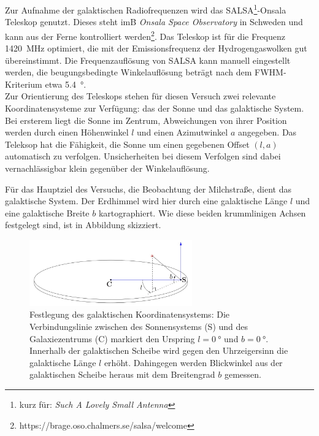 \documentclass[../main.tex]{subfiles}
\begin{document}
Zur Aufnahme der galaktischen Radiofrequenzen wird das SALSA\footnote{kurz für: \textit{Such A Lovely Small Antenna}}-Onsala Teleskop genutzt. Dieses steht imB \textit{Onsala Space Observatory} in Schweden und kann aus der Ferne kontrolliert werden\footnote{https://brage.oso.chalmers.se/salsa/welcome}. Das Teleskop ist für die Frequenz \SI{1420}{\mega\hertz} optimiert, die mit der Emissionsfrequenz der Hydrogengaswolken gut übereinstimmt. Die Frequenzauflösung von SALSA kann manuell eingestellt werden, die beugungsbedingte Winkelauflösung beträgt nach dem FWHM-Kriterium etwa \SI{5.4}{\degree}.\\ 

\noindent Zur Orientierung des Teleskops stehen für diesen Versuch zwei relevante Koordinatensysteme zur Verfügung: das der Sonne und das galaktische System. Bei ersterem liegt die Sonne im Zentrum, Abweichungen von ihrer Position werden durch einen Höhenwinkel $l$ und einen Azimutwinkel $a$ angegeben. Das Teleksop hat die Fähigkeit, die Sonne um einen gegebenen Offset $(l,a)$ automatisch zu verfolgen. Unsicherheiten bei diesem Verfolgen sind dabei vernachlässigbar klein gegenüber der Winkelauflösung.

 Für das Hauptziel des Versuchs, die Beobachtung der Milchstraße, dient das galaktische System. Der Erdhimmel wird hier durch eine galaktische Länge $l$ und eine galaktische Breite $b$ kartographiert. Wie diese beiden krummlinigen Achsen festgelegt sind, ist in Abbildung skizziert.
\begin{figure}[H]
    \centering
    \includegraphics[width=7cm]{Bilddateien/Aufbau/GalaktischesSystem.jpg}
    \caption{Festlegung des galaktischen Koordinatensystems: Die Verbindungslinie zwischen des Sonnensystems (S) und des Galaxiezentrums (C) markiert den Urspring $l=\SI{0}{\degree}$ und $b=\SI{0}{\degree}$. Innerhalb der galaktischen Scheibe wird gegen den Uhrzeigersinn die galaktische Länge $l$ erhöht. Dahingegen werden Blickwinkel aus der galaktischen Scheibe heraus mit dem Breitengrad $b$ gemessen.}
\end{figure}
\end{document}
